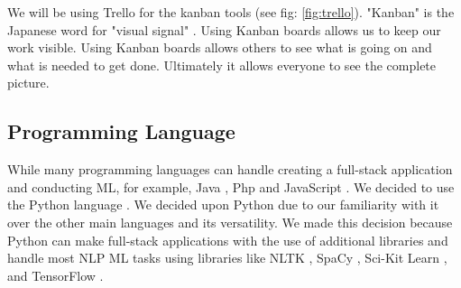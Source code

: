 	
	We will be using Trello for the kanban tools (see fig: \ref{fig:trello}). "Kanban" is the Japanese word for "visual signal" \cite{kanbanmeaning}. Using Kanban boards allows us to keep our work visible. Using Kanban boards allows others to see what is going on and what is needed to get done. Ultimately it allows everyone to see the complete picture.
	
	
	
	
	\subsection{Programming Language}
	While many programming languages can handle creating a full-stack application and conducting ML, for example, Java \cite{arnold2005java}, Php \cite{bakken2000php} and JavaScript \cite{flanagan2006javascript}. We decided to use the Python language \cite{Python}. We decided upon Python due to our familiarity with it over the other main languages and its versatility. We made this decision because Python can make full-stack applications with the use of additional libraries and handle most NLP ML tasks using libraries like NLTK \cite{loper2002nltk}, SpaCy \cite{spacy2}, Sci-Kit Learn \cite{scikit-learn}, and TensorFlow \cite{tensorflow2015-whitepaper}.
	
